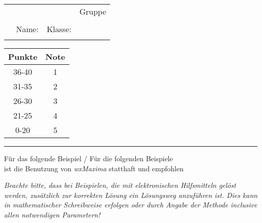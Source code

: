 \documentclass[10pt,a4paper]{article}
\makeatletter
\newcommand{\myID}{\@ID}
\newcommand{\myDate}{\@Date}
\newcommand{\myTitle}{\@Title}
\newcommand{\myClass}{\@Class}
\newcommand{\myTableDir}{\@TableDir}
\makeatother
\begin{document}
\thispagestyle{empty}
{\sf

\begin{table}
\begin{tabularx}{\linewidth}{rXXl}
		                  & \textbf{\myTitle} & \myDate & Gruppe \myID  \\[1mm]
		\large{\myClass}	&								    & 			  &				        \\[1mm]	
		                  & Name:							& Klasse: &				        \\
		\\
\end{tabularx}
\end{table}


\hfill
\begin{tabular}{|c|c|}
  \hline
  Punkte  & Note  \\ \hline
  36-40   & 1     \\ \hline
  31-35   & 2     \\ \hline
  26-30   & 3     \\ \hline   
  21-25   & 4     \\ \hline
  0-20    & 5     \\ \hline   
\end{tabular}

\hrule

\vspace*{5mm}

\begin{tcolorbox}[arc=0mm,  standard jigsaw, opacityback=0, boxrule=1pt]
\begin{center}
Für das folgende Beispiel / Für die folgenden Beispiele \\
ist die Benutzung von \textit{wxMaxima} statthaft und empfohlen
\end{center}
\end{tcolorbox}

\begin{tcolorbox}[arc=0mm,  standard jigsaw, opacityback=0, boxrule=1pt]
\textit{Beachte bitte, dass bei Beispielen, die mit elektronischen Hilfsmitteln gelöst werden,
zusätzlich zur korrekten Lösung ein Lösungsweg anzuführen ist.
Dies kann in mathematischer Schreibweise erfolgen oder durch Angabe der Methode
inclusive allen notwendigen Parametern!}
\end{tcolorbox}

}
\newpage

\begin{enumerate}[leftmargin=*]


\end{enumerate}
\end{document}
